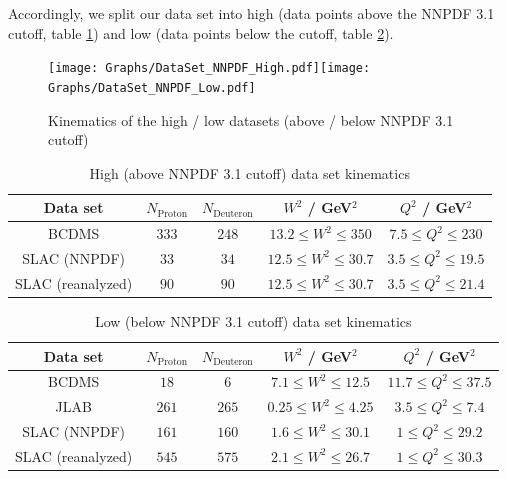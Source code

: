 \documentclass[12pt,a4paper]{report}
\begin{document}
Accordingly, we split our data set into high (data points above the NNPDF 3.1 cutoff, table \ref{tb:Kinematics_High}) and low (data points below the cutoff, table \ref{tb:Kinematics_Low}).
\begin{figure}[h]
\begin{center}
\texttt{[image: Graphs/DataSet\_NNPDF\_High.pdf]}\texttt{[image: Graphs/DataSet\_NNPDF\_Low.pdf]}
\caption{Kinematics of the high / low datasets (above / below NNPDF 3.1 cutoff)}
\label{fig:design_kinematics_NNPDF_PHN} \label{fig:design_kinematics_NNPDF_PLN}
\end{center}
\end{figure}

\begin{table}[h]
\begin{center}
\begin{tabular}{|c|c|c|c|c|}
\hline
Data set & $N_{\textrm{Proton}}$ & $N_{\textrm{Deuteron}}$ & $W^2$ / GeV$^2$ & $Q^2$ / GeV$^2$\\
\hline
BCDMS & $333$ & $248$ & $ 13.2 \le W^2 \le 350$ & $ 7.5 \le Q^2 \le 230$ \\
SLAC (NNPDF) & $33$ & $34$ & $ 12.5 \le W^2 \le 30.7$ & $ 3.5 \le Q^2 \le 19.5$ \\
SLAC (reanalyzed) & $90$ & $90$ & $ 12.5 \le W^2 \le 30.7$ & $ 3.5 \le Q^2 \le 21.4$ \\
\hline
\end{tabular}
\caption{High (above NNPDF 3.1 cutoff) data set kinematics}
\label{tb:Kinematics_High}
\end{center}
\end{table}

\begin{table}[h]
\begin{center}
\begin{tabular}{|c|c|c|c|c|}
\hline
Data set & $N_{\textrm{Proton}}$ & $N_{\textrm{Deuteron}}$ & $W^2$ / GeV$^2$ & $Q^2$ / GeV$^2$\\
\hline
BCDMS & $18$ & $6$ & $ 7.1 \le W^2 \le 12.5$ & $ 11.7 \le Q^2 \le 37.5$ \\
JLAB & $261$ & $265$ & $ 0.25 \le W^2 \le 4.25$ & $ 3.5 \le Q^2 \le 7.4$ \\
SLAC (NNPDF) & $161$ & $160$ & $ 1.6 \le W^2 \le 30.1$ & $ 1 \le Q^2 \le 29.2$ \\
SLAC (reanalyzed) & $545$ & $575$ & $ 2.1 \le W^2 \le 26.7$ & $ 1 \le Q^2 \le 30.3$ \\
\hline
\end{tabular}
\caption{Low (below NNPDF 3.1 cutoff) data set kinematics}
\label{tb:Kinematics_Low}
\end{center}
\end{table}
\end{document}
